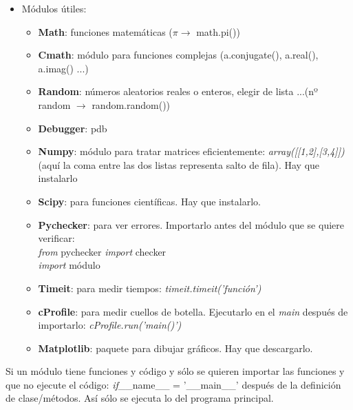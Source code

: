 \begin{itemize}
	\item Módulos útiles:
	\begin{itemize}
		\item \textbf{Math}: funciones matemáticas ($\pi \rightarrow$ math.pi())
		\item \textbf{Cmath}: módulo para funciones complejas (a.conjugate(), a.real(), a.imag() ...)
		\item \textbf{Random}: números aleatorios reales o enteros, elegir de lista ...(nº random $\rightarrow$ random.random())
		\item \textbf{Debugger}: pdb %
		\item \textbf{Numpy}: módulo para tratar matrices eficientemente: \textit{array([[1,2],[3,4]])}(aquí la coma entre las dos listas representa salto de fila). Hay que instalarlo
		\item \textbf{Scipy}: para funciones científicas. Hay que instalarlo.
		\item \textbf{Pychecker}: para ver errores. Importarlo antes del módulo que se quiere verificar:\\
		\textit{from} pychecker \textit{import} checker\\ \textit{import} módulo
		\item \textbf{Timeit}: para medir tiempos: \textit{timeit.timeit('función')}
		\item \textbf{cProfile}: para medir cuellos de botella. Ejecutarlo en el \textit{main} después de importarlo: \textit{cProfile.run('main()')}
		\item \textbf{Matplotlib}: paquete para dibujar gráficos. Hay que descargarlo. 
		\end{itemize}
	\end{itemize}

	\noindent Si un módulo tiene funciones y código y sólo se quieren importar las funciones y que no ejecute el código: \textit{if}\_\_name\_\_ = '\_\_main\_\_' después de la definición de clase/métodos. Así sólo se ejecuta lo del programa principal.
